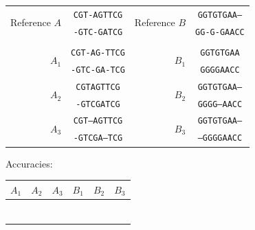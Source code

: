\documentclass[11pt, oneside]{article}   	%
\begin{document}
\begin{enumerate}
\renewcommand{\arraystretch}{1}
\begin{center}
\begin{tabular}{r|c|r|c|}
\cline{2-2} \cline{4-4}
\multirow{2}{*}{Reference $A$} & \texttt{CGT-AGTTCG} & \multirow{2}{*}{Reference $B$} & \texttt{GGTGTGAA--}\\
& \texttt{-GTC-GATCG} & & \texttt{GG-G-GAACC}\\
\cline{2-2} \cline{4-4}
\multicolumn{3}{c}{}\\
\cline{2-2} \cline{4-4}
\multirow{2}{*}{$A_1$} & \texttt{CGT-AG-TTCG} & \multirow{2}{*}{$B_1$}  & \texttt{GGTGTGAA}\\
& \texttt{-GTC-GA-TCG} & & \texttt{GGGGAACC}\\
\cline{2-2} \cline{4-4}
\multirow{2}{*}{$A_2$} & \texttt{CGTAGTTCG} &  \multirow{2}{*}{$B_2$}  & \texttt{GGTGTGAA--}\\
& \texttt{-GTCGATCG} & & \texttt{GGGG--AACC}\\
\cline{2-2} \cline{4-4}
\multirow{2}{*}{$A_3$} & \texttt{CGT--AGTTCG} & \multirow{2}{*}{$B_3$}   & \texttt{GGTGTGAA--}\\
& \texttt{-GTCGA--TCG} & & \texttt{--GGGGAACC}\\
\cline{2-2} \cline{4-4}

\end{tabular}
\vspace{2em}

Accuracies:
\begin{tabular}{cccccc}
$A_1$ & $A_2$ & $A_3$ & $B_1$ & $B_2$ & $B_3$ \\
\hline
\multicolumn{1}{|c|}{~\hspace{3em}~} & \multicolumn{1}{|c|}{~\hspace{3em}~} & \multicolumn{1}{|c|}{~\hspace{3em}~} & \multicolumn{1}{||c|}{~\hspace{3em}~} & \multicolumn{1}{|c|}{~\hspace{3em}~} & \multicolumn{1}{|c|}{~\hspace{3em}~}\\
\multicolumn{1}{|c|}{} & \multicolumn{1}{|c|}{} & \multicolumn{1}{|c|}{} & \multicolumn{1}{||c|}{} & \multicolumn{1}{|c|}{} & \multicolumn{1}{|c|}{}\\
\multicolumn{1}{|c|}{} & \multicolumn{1}{|c|}{} & \multicolumn{1}{|c|}{} & \multicolumn{1}{||c|}{} & \multicolumn{1}{|c|}{} & \multicolumn{1}{|c|}{}\\
\hline
\end{tabular}



\end{center}
\end{enumerate}
\end{document}
